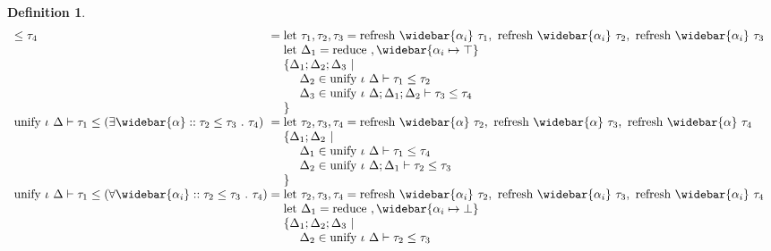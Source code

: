 \documentclass[manuscript]{acmart}
\theoremstyle{definition}
\newtheorem{definition}{Definition}[section]
\begin{document}
\begin{definition}
\[\begin{array}{l @{} l}
    \leq 
    \tau_4
    &{} = 
    \begin{array}[t]{@{} l}
      \text{let } \tau_1, \tau_2, \tau_3 = 
      \text{refresh } \widebar{\alpha_i}\ \tau_1,\ 
      \text{refresh } \widebar{\alpha_i}\ \tau_2,\ 
      \text{refresh } \widebar{\alpha_i}\ \tau_3
      \\
      \text{let } \Delta_1 = \text{reduce}\ , \widebar{\alpha_i \mapsto \top}
      \\
      \{\Delta_1;\Delta_2;\Delta_3\ |
      \\ 
      \ \ \ \ \Delta_2 \in \text{unify } \iota\ \Delta \vdash \tau_1 \leq \tau_2
      \\
      \ \ \ \ \Delta_3 \in \text{unify } \iota\ \Delta;\Delta_1;\Delta_2 \vdash \tau_3 \leq \tau_4
      \\
      \}
    \end{array}
    \\
    \text{unify } \iota\ \Delta \vdash
    \tau_1
    \leq 
    (\exists \widebar{\alpha} :: \tau_2 \leq \tau_3\ .\ \tau_4)
    &{} = 
    \begin{array}[t]{@{} l}
      \text{let } \tau_2, \tau_3, \tau_4 = 
      \text{refresh } \widebar{\alpha}\ \tau_2,\ 
      \text{refresh } \widebar{\alpha}\ \tau_3,\ 
      \text{refresh } \widebar{\alpha}\ \tau_4
      \\
      \{\Delta_1;\Delta_2\ |
      \\ 
      \ \ \ \ \Delta_1 \in \text{unify } \iota\ \Delta \vdash \tau_1 \leq \tau_4
      \\
      \ \ \ \ \Delta_2 \in \text{unify } \iota\ \Delta;\Delta_1 \vdash \tau_2 \leq \tau_3
      \\
      \}
    \end{array}
    \\
    \text{unify } \iota\ \Delta \vdash
    \tau_1
    \leq 
    (\forall \widebar{\alpha_i} :: \tau_2 \leq \tau_3\ .\ \tau_4)
    &{} = 
    \begin{array}[t]{@{} l}
      \text{let } \tau_2, \tau_3, \tau_4 = 
      \text{refresh } \widebar{\alpha_i}\ \tau_2,\ 
      \text{refresh } \widebar{\alpha_i}\ \tau_3,\ 
      \text{refresh } \widebar{\alpha_i}\ \tau_4
      \\
      \text{let } \Delta_1 = \text{reduce}\ , \widebar{\alpha_i \mapsto \bot}
      \\
      \{\Delta_1;\Delta_2;\Delta_3\ |
      \\ 
      \ \ \ \ \Delta_2 \in \text{unify } \iota\ \Delta \vdash \tau_2 \leq \tau_3

\end{array}
\end{array}\]
\end{definition}
\end{document}

